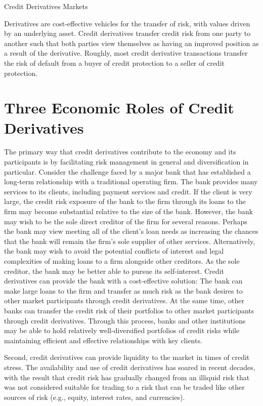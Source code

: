 \documentclass[11pt]{article}
\begin{document}
Credit Derivatives Markets

Derivatives are cost-effective vehicles for the transfer of risk, with values driven by an underlying asset. Credit derivatives transfer credit risk from one party to another such that both parties view themselves as having an improved position as a result of the derivative. Roughly, most credit derivative transactions transfer the risk of default from a buyer of credit protection to a seller of credit protection.

\section*{Three Economic Roles of Credit Derivatives}
The primary way that credit derivatives contribute to the economy and its participants is by facilitating risk management in general and diversification in particular. Consider the challenge faced by a major bank that has established a long-term relationship with a traditional operating firm. The bank provides many services to its clients, including payment services and credit. If the client is very large, the credit risk exposure of the bank to the firm through its loans to the firm may become substantial relative to the size of the bank. However, the bank may wish to be the sole direct creditor of the firm for several reasons. Perhaps the bank may view meeting all of the client's loan needs as increasing the chances that the bank will remain the firm's sole supplier of other services. Alternatively, the bank may wish to avoid the potential conflicts of interest and legal complexities of making loans to a firm alongside other creditors. As the sole creditor, the bank may be better able to pursue its self-interest. Credit derivatives can provide the bank with a cost-effective solution: The bank can make large loans to the firm and transfer as much risk as the bank desires to other market participants through credit derivatives. At the same time, other banks can transfer the credit risk of their portfolios to other market participants through credit derivatives. Through this process, banks and other institutions may be able to hold relatively well-diversified portfolios of credit risks while maintaining efficient and effective relationships with key clients.

Second, credit derivatives can provide liquidity to the market in times of credit stress. The availability and use of credit derivatives has soared in recent decades, with the result that credit risk has gradually changed from an illiquid risk that was not considered suitable for trading to a risk that can be traded like other sources of risk (e.g., equity, interest rates, and currencies).
\end{document}
